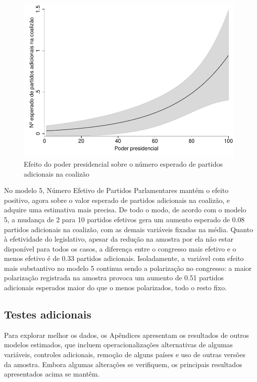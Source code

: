 \begin{figure}[htb]
	\label{fig:figura3}
	\caption{Efeito do poder presidencial sobre o número esperado de partidos adicionais na coalizão}
	\begin{center}
	    \includegraphics[scale=1]{negretto.pdf}
	\end{center}
\end{figure}


No modelo 5, Número Efetivo de Partidos Parlamentares mantém o efeito positivo, agora sobre o valor esperado de partidos adicionais na coalizão, e adquire uma estimativa mais precisa. De todo o modo, de acordo com o modelo 5, a mudança de 2 para 10 partidos efetivos gera um aumento esperado de 0.08 partidos adicionais na coalizão, com as demais variáveis fixadas na média. Quanto à efetividade do legislativo, apesar da redução na amostra por ela não estar disponível para todos os casos, a diferença entre o congresso mais efetivo e o menos efetivo é de 0.33 partidos adicionais. Isoladamente, a variável com efeito mais substantivo no modelo 5 continua sendo a polarização no congresso: a maior polarização registrada na amostra provoca um aumento de 0.51 partidos adicionais esperados maior do que o menos polarizados, todo o resto fixo.



\FloatBarrier
\subsection{Testes adicionais}

Para explorar melhor os dados, os Apêndices apresentam os resultados de outros modelos estimados, que incluem operacionalizações alternativas de algumas variáveis, controles adicionais, remoção de alguns países e uso de outras versões da amostra. Embora algumas alterações se verifiquem, os principais resultados apresentados acima se mantêm.